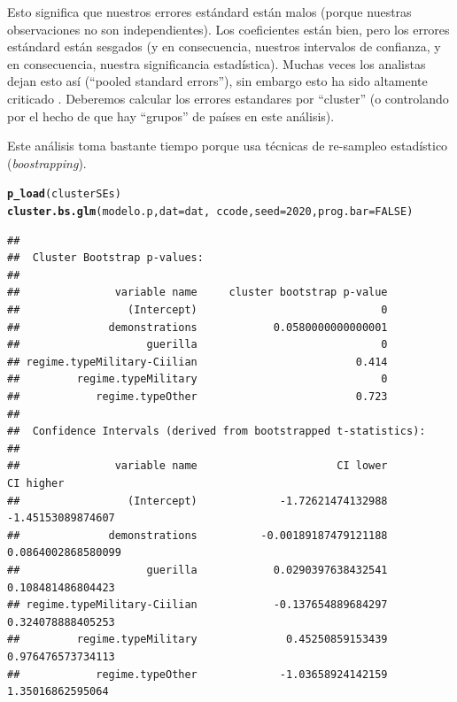 \documentclass[onesided]{article}\usepackage[]{graphicx}\usepackage[]{color}
\makeatletter
\newcommand{\hlnum}[1]{\textcolor[rgb]{0.686,0.059,0.569}{#1}}%
\newcommand{\hlopt}[1]{\textcolor[rgb]{0,0,0}{#1}}%
\newcommand{\hlstd}[1]{\textcolor[rgb]{0.345,0.345,0.345}{#1}}%
\newcommand{\hlkwc}[1]{\textcolor[rgb]{0.333,0.667,0.333}{#1}}%
\newcommand{\hlkwd}[1]{\textcolor[rgb]{0.737,0.353,0.396}{\textbf{#1}}}%
\newenvironment{kframe}{%
 \def\at@end@of@kframe{}%
 \ifinner\ifhmode%
  \def\at@end@of@kframe{\end{minipage}}%
  \begin{minipage}{\columnwidth}%
 \fi\fi%
 \def\FrameCommand##1{\hskip\@totalleftmargin \hskip-\fboxsep
 \colorbox{shadecolor}{##1}\hskip-\fboxsep
     \hskip-\linewidth \hskip-\@totalleftmargin \hskip\columnwidth}%
 \MakeFramed {\advance\hsize-\width
   \@totalleftmargin\z@ \linewidth\hsize
   \@setminipage}}%
 {\par\unskip\endMakeFramed%
 \at@end@of@kframe}
\newenvironment{knitrout}{}{} %
\makeatother
\begin{document}
Esto significa que nuestros errores est\'andard est\'an malos (porque nuestras observaciones no son independientes). Los coeficientes est\'an bien, pero los errores est\'andard est\'an sesgados (y en consecuencia, nuestros intervalos de confianza, y en consecuencia, nuestra significancia estad\'istica). Muchas veces los analistas dejan esto as\'i (``pooled standard errors''), sin embargo esto ha sido altamente criticado \parencite{Green2001}. Deberemos calcular los errores estandares por ``cluster'' (o controlando por el hecho de que hay ``grupos'' de pa\'ises en este an\'alisis).

Este an\'alisis toma bastante tiempo porque usa t\'ecnicas de re-sampleo estad\'istico (\emph{boostrapping}). 

\begin{knitrout}
\color{fgcolor}\begin{kframe}
\begin{alltt}
\hlkwd{p_load}\hlstd{(clusterSEs)}
\hlkwd{cluster.bs.glm}\hlstd{(modelo.p,} \hlkwc{dat} \hlstd{= dat,} \hlopt{~} \hlstd{ccode,} \hlkwc{seed}\hlstd{=}\hlnum{2020}\hlstd{,} \hlkwc{prog.bar} \hlstd{=} \hlnum{FALSE}\hlstd{)}
\end{alltt}
\begin{verbatim}
## 
##  Cluster Bootstrap p-values:  
##  
##               variable name     cluster bootstrap p-value
##                 (Intercept)                             0
##              demonstrations            0.0580000000000001
##                    guerilla                             0
## regime.typeMilitary-Ciilian                         0.414
##         regime.typeMilitary                             0
##            regime.typeOther                         0.723
## 
##  Confidence Intervals (derived from bootstrapped t-statistics):  
##  
##               variable name                      CI lower                     CI higher
##                 (Intercept)             -1.72621474132988             -1.45153089874607
##              demonstrations          -0.00189187479121188            0.0864002868580099
##                    guerilla            0.0290397638432541             0.108481486804423
## regime.typeMilitary-Ciilian            -0.137654889684297             0.324078888405253
##         regime.typeMilitary              0.45250859153439             0.976476573734113
##            regime.typeOther             -1.03658924142159              1.35016862595064
\end{verbatim}
\end{kframe}
\end{knitrout}
\end{document}
